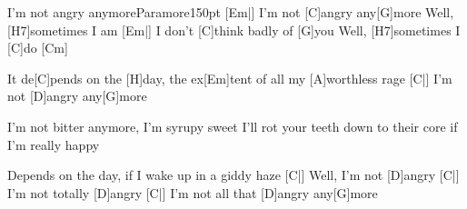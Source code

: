 \begin{song}{I'm not angry anymore}{Paramore}{150pt}
%
[Em|]{} I'm not [C]angry any[G]more
Well, [H7]sometimes I am
[Em|]{} I don't [C]think badly of [G]you
Well, [H7]sometimes I [C]do [Cm]{}

\chorus%
It de[C]pends on the [H]day,
the ex[Em]tent of all my [A]worthless rage
[C|]{} I'm not [D]angry any[G]more

%
I'm not bitter anymore,
I'm syrupy sweet
I'll rot your teeth down to their core
if I'm really happy

\chorus%
Depends on the day,
if I wake up in a giddy haze
[C|]{} Well, I'm not [D]angry
[C|]{} I'm not totally [D]angry
[C|]{} I'm not all that [D]angry any[G]more

\end{song}
\vfil
\hfil{}
